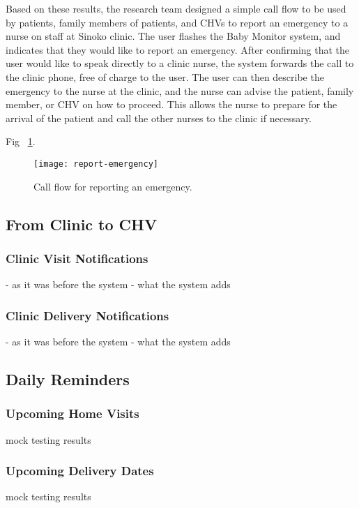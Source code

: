 Based on these results, the research team designed a simple call flow to be used by patients, family members of patients, and CHVs to report an emergency to a nurse on staff at Sinoko clinic. The user flashes the Baby Monitor system, and indicates that they would like to report an emergency. After confirming that the user would like to speak directly to a clinic nurse, the system forwards the call to the clinic phone, free of charge to the user. The user can then describe the emergency to the nurse at the clinic, and the nurse can advise the patient, family member, or CHV on how to proceed. This allows the nurse to prepare for the arrival of the patient and call the other nurses to the clinic if necessary. 

Fig ~\ref{fig:emergency}.
\begin{figure}[tbp]
	\begin{center}
	\texttt{[image: report-emergency]}
	\end{center}
	\caption{Call flow for reporting an emergency.}
	\label{fig:emergency}
\end{figure}

\subsection{From Clinic to CHV}
\subsubsection{Clinic Visit Notifications}
- as it was before the system
- what the system adds

\subsubsection{Clinic Delivery Notifications}
- as it was before the system
- what the system adds

\subsection{Daily Reminders}
\subsubsection{Upcoming Home Visits}
mock testing results

\subsubsection{Upcoming Delivery Dates}
mock testing results


